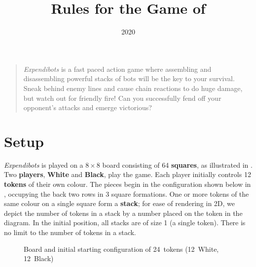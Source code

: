 \documentclass[]{article}
\title{
    {\LARGE Rules for the Game of}
    \\[1ex]
    {\Huge\bf \gameName}
}
\author{
    \textbf{Adam Kues}
    and
    \textbf{Matthew Farrugia-Roberts}
    \\
    \textit{The University of Melbourne}
    \\
    Contact: \href
      {mailto:matt.farrugia@unimelb.edu.au}
      {\tt matt.farrugia@unimelb.edu.au}
}
\date{2020}
\newcommand{\gameName}{Expendibots}
\newcommand{\white}[3] {
    \foreach \x in {1,...,#3}
        \node[draw,thick,minimum size=17,fill=black!30,circle]
            at ({.5+#1},{\x*.1+.4+#2}) {};
    \node[draw,thick,minimum size=17,fill=white,circle]
        at ({.5+#1},{#3*.1+.5+#2}) {};
    \node[]
        at ({.5+#1},{#3*.1+.5+#2}) {\large #3};
}
\newcommand{\black}[3] {
    \foreach \x in {1,...,#3}
        \node[draw,thick,minimum size=15,fill=black!60,rounded corners=0.6mm]
            at ({.5+#1},{\x*.1+.4+#2}) {};
    \node[draw,thick,minimum size=15,fill=black!30,rounded corners=0.6mm]
        at ({.5+#1},{#3*.1+.5+#2}) {};
    \node[]
        at ({.5+#1},{#3*.1+.5+#2}) {\large #3};
}
\newcommand{\board} {
    \tikzset{
        x=0.8cm,
        y=0.8cm,
    }
    \draw[fill=black!5,very thick] (0, 0) rectangle (8, 8);
    \draw[step=1] (0, 0) grid (8, 8);
}
\begin{document}
\maketitle

\begin{quote}
    \emph{\gameName} is a fast paced action game where assembling and
    disassembling powerful stacks of bots will be the key to your survival.
    Sneak behind enemy lines and cause chain reactions to do huge damage,
    but watch out for friendly fire!
    Can you successfully fend off your opponent's attacks and emerge
    victorious?
\end{quote}

\section*{Setup}

\emph{\gameName} is played on a $8 \times 8$ board consisting of 64
\textbf{squares}, as illustrated in . Two \textbf{players},
\textbf{White} and \textbf{Black}, play the game.
%
Each player initially controls 12 \textbf{tokens} of their own colour.
The pieces begin in the configuration shown below in ,
occupying the back two rows in 3 square formations.
%
One or more tokens of the same colour on a single square form a
\textbf{stack}; for ease of rendering in 2D, we depict the number
of tokens in a stack by a number placed on the token in the diagram.
%
In the initial position, all stacks are of size 1 (a single token).
There is no limit to the number of tokens in a stack.

\begin{figure}[ht!]
    \centering
    \caption{
    \label{fig:board}
        Board and initial starting configuration of 24~tokens (12~White,
        12~Black)
    }
\end{figure}
\end{document}
